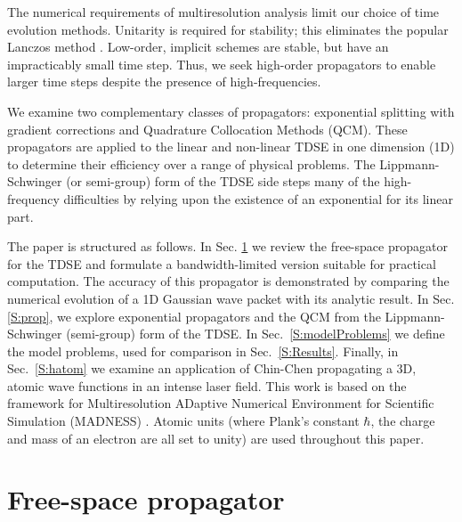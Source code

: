 \documentclass[review,letterpaper]{elsarticle}
\begin{document}
The numerical requirements of multiresolution analysis limit our choice of time evolution methods.
Unitarity is required for stability; this eliminates the popular Lanczos method \cite{Leforestier:1991co}.
Low-order, implicit schemes are stable, but have an impracticably small time step.
Thus, we seek high-order propagators to enable larger time steps despite
the presence of high-frequencies.

We examine two complementary classes of propagators:
exponential splitting with gradient corrections and Quadrature Collocation Methods (QCM).
These propagators are applied to the linear and non-linear TDSE in one dimension (1D)
to determine their efficiency over a range of physical problems.
The Lippmann-Schwinger (or semi-group) form of the TDSE side steps many of the
high-frequency difficulties by relying upon the existence of an exponential for its linear part.

The paper is structured as follows. In Sec. \ref{S:freeProp} we review the free-space
propagator for the TDSE and formulate a bandwidth-limited version suitable for practical computation.
The accuracy of this propagator is demonstrated by comparing the numerical
evolution of a 1D Gaussian wave packet with its analytic result.
In Sec. \ref{S:prop}, we explore exponential propagators
and the QCM from the Lippmann-Schwinger (semi-group) form of the TDSE.
In Sec.~\ref{S:modelProblems} we define the model problems,
used for comparison in Sec.~\ref{S:Results}.
Finally, in Sec.~\ref{S:hatom} we examine an application
of Chin-Chen \cite{Chin:2001vs} propagating a 3D, atomic wave functions in an intense laser field.
This work is based on the framework for Multiresolution ADaptive Numerical
Environment for Scientific Simulation (MADNESS) \cite{madnessDOC}.
Atomic units (where Plank's constant $\hbar$, the charge and mass of an
electron are all set to unity) are used throughout this paper.




\section{Free-space propagator}
\label{S:freeProp}
\end{document}
